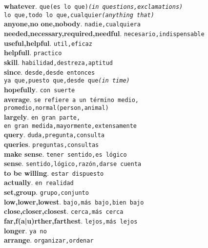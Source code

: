 \documentclass[twocolumn]{article}
\begin{document}
	\textsf{\textbf{whatever}}. \texttt{que(es lo que){\scriptsize \textsl{(in questions,exclamations)}}\\
										         lo que,todo lo que,cualquier{\scriptsize \textsl{(anything that)}}}\\
	\textsf{\textbf{anyone,no one,nobody}}. \texttt{nadie,cualquiera}\\
	\textsf{\textbf{needed,necessary,required,needful}}. \texttt{necesario,indispensable}\\
	\textsf{\textbf{useful,helpful}}. \texttt{util,eficaz}\\
	\textsf{\textbf{helpfull}}. \texttt{practico}\\
	\textsf{\textbf{skill}}. \texttt{habilidad,destreza,aptitud}\\
	\textsf{\textbf{since}}. \texttt{desde,desde entonces\\ya que,puesto que,desde que{\scriptsize \textsl{(in time)}}}\\
	\textsf{\textbf{hopefully}}. \texttt{con suerte}\\
	\textsf{\textbf{average}}. \texttt{se refiere a un t\'ermino medio,\\promedio,normal(person,animal)}\\
	\textsf{\textbf{largely}}. \texttt{en gran parte,\\en gran medida,mayormente,extensamente}\\
	\textsf{\textbf{query}}. \texttt{duda,pregunta,consulta}\\
	\textsf{\textbf{queries}}. \texttt{preguntas,consultas}\\
	\textsf{\textbf{make sense}}. \texttt{tener sentido,es l\'ogico}\\
	\textsf{\textbf{sense}}. \texttt{sentido,l\'ogico,raz\'on,darse cuenta}\\
	\textsf{\textbf{to be willing}}. \texttt{estar dispuesto}\\
	\textsf{\textbf{actually}}. \texttt{en realidad}\\
	\textsf{\textbf{set,group}}. \texttt{grupo,conjunto}\\
	\textsf{\textbf{low,lower,lowest}}. \texttt{bajo,m\'as bajo,bien bajo}\\
	\textsf{\textbf{close,closer,closest}}. \texttt{cerca,m\'as cerca}\\
	\textsf{\textbf{far,f(a|u)rther,farthest}}. \texttt{lejos,m\'as lejos}\\
	\textsf{\textbf{longer}}. \texttt{ya no}\\
	\textsf{\textbf{arrange}}. \texttt{organizar,ordenar}\\
\end{document}
